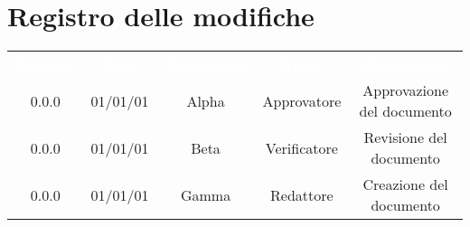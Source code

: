 \section*{Registro delle modifiche}

{\renewcommand{\arraystretch}{1.5}
\begin{tabular}{ccccc}
	\rowcolor[RGB]{33, 73, 50}
	\textcolor{white}{\textbf{Versione}} & \textcolor{white}{\textbf{Data}} & \textcolor{white}
	{\textbf{Nominativo}} & \textcolor{white}{\textbf{Ruolo}} & \textcolor{white}
	{\textbf{Descrizione}}\\
	\rowcolor[RGB]{216, 235, 171}
	0.0.0 & 01/01/01 & Alpha & Approvatore & Approvazione del documento\\
	\rowcolor[RGB]{233, 245, 206}
	0.0.0 & 01/01/01 & Beta & Verificatore & Revisione del documento\\
	\rowcolor[RGB]{216, 235, 171}
	0.0.0 & 01/01/01 & Gamma & Redattore & Creazione del documento\\
	
\end{tabular}	
}